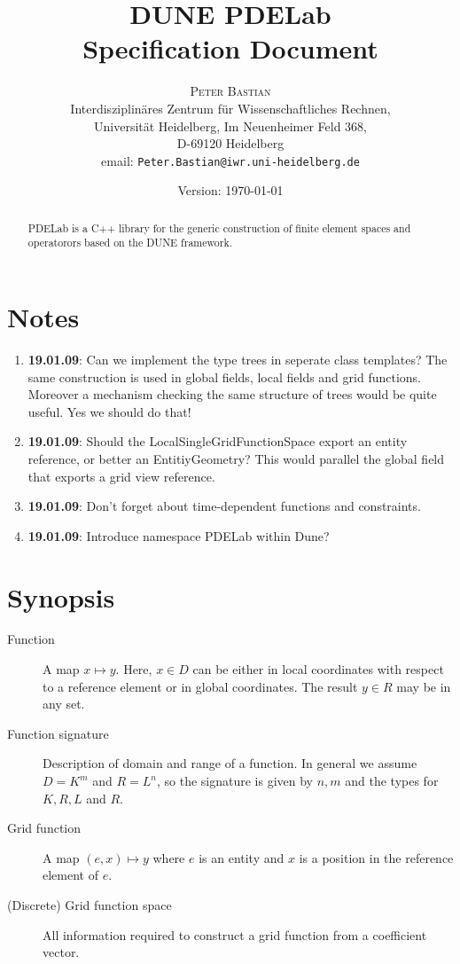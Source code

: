 \documentclass[11pt,a4paper,DIV11,%
notitlepage,oneside,abstracton,%
bibtotoc]{scrartcl}
\title{DUNE PDELab\\
Specification Document}
\author{\textsc{Peter Bastian}\\
Interdisziplinäres Zentrum für Wissenschaftliches Rechnen,\\
 Universität Heidelberg, Im Neuenheimer Feld 368, \\
D-69120 Heidelberg\\
email: \texttt{Peter.Bastian@iwr.uni-heidelberg.de}
}
\date{Version: \today}
\begin{document}
\maketitle

\begin{abstract}
PDELab is a C++ library for the generic construction of finite element
spaces and operatorors based on the DUNE framework.
\end{abstract}

\cleardoublepage
\tableofcontents

\cleardoublepage
\section{Notes}

\begin{enumerate}[1)]
\item \textbf{19.01.09}: Can we implement the type trees in seperate
  class templates? The
  same construction is used in global fields, local fields and grid
  functions. Moreover a mechanism checking the same structure of trees
  would be quite useful. Yes we should do that!
\item \textbf{19.01.09}: Should the LocalSingleGridFunctionSpace export an entity
  reference, or better an EntitiyGeometry? 
  This would parallel the global field that exports a grid
  view reference.
\item \textbf{19.01.09}: Don't forget about time-dependent functions
  and constraints.
\item \textbf{19.01.09}: Introduce namespace PDELab within Dune?
\end{enumerate}

\section{Synopsis}

\begin{description}
\item[Function] A map $x\mapsto y$. Here, $x\in D$ can be either in local
  coordinates with respect to a reference element or in global
  coordinates. The result $y\in R$ may be in any set.
\item[Function signature] Description of domain and range of a
  function. In general we assume $D=K^m$ and $R=L^n$, so the signature
  is given by $n, m$ and the types for $K, R, L$ and $R$.
\item[Grid function] A map $(e,x)\mapsto y$ where $e$ is an entity and
  $x$ is a position in the reference element of $e$.
\item[(Discrete) Grid function space] All information required to construct a
  grid function from a coefficient vector.
\end{description}
\end{document}
